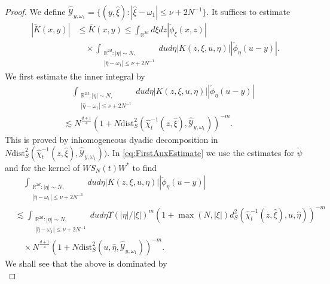\documentclass[10pt,a4paper]{amsart}
\newcommand{\R}{\mathbb{R}}
\begin{document}
\begin{proof}
We define $\hat{\mathcal{Y}}_{y,\omega_1} = \{ (y,\hat{\xi}) : |\hat{\xi} - \omega_1| \leq \nu + 2 N^{-1} \} $. It suffices to estimate
\begin{equation*}
\begin{split}
    |\tilde{K}(x,y)| &\leq \bar{K}(x,y) \leq \int_{\R^{2d}} d\xi dz |\check{\phi}_{\xi}(x,z)| \\
    &\quad \times \int_{\substack{\R^{2d}: |\eta| \sim N, \\ |\hat{\eta} - \omega_1| \leq \nu + 2 N^{-1}}} du d\eta |K(z,\xi,u,\eta)| |\check{\phi}_{\eta}(u-y)|.
\end{split}
\end{equation*}
We first estimate the inner integral by
\begin{equation}
\label{eq:FirstAuxEstimate}
\begin{split}
    &\quad \int_{\substack{\R^{2d}: |\eta| \sim N, \\ |\hat{\eta} - \omega_1| \leq \nu + 2 N^{-1}}} du d\eta |K(z,\xi,u,\eta)| |\check{\phi}_{\eta}(u-y)| \\
    &\lesssim N^{\frac{d+1}{4}} (1 + N \text{dist}_S^2(\hat{\chi}_t^{-1}(z,\hat{\xi}),\hat{\mathcal{Y}}_{y,\omega_1}))^{-m}.
\end{split}
\end{equation}
This is proved by inhomogeneous dyadic decomposition in $N \text{dist}_S^2(\hat{\chi}_t^{-1}(z,\hat{\xi}),\hat{\mathcal{Y}}_{y,\omega_1}))$. In \eqref{eq:FirstAuxEstimate} we use the estimates for $\check{\psi}$ and for the kernel of $W S_N(t) W^*$ to find
\begin{equation*}
\begin{split}
    &\quad \int_{\substack{\R^{2d}: |\eta| \sim N, \\ |\hat{\eta} - \omega_1| \leq \nu + 2 N^{-1}}} du d\eta |K(z,\xi,u,\eta)| |\check{\phi}_{\eta}(u-y)| \\
    &\lesssim \int_{\substack{\R^{2d}: |\eta| \sim N, \\ |\hat{\eta} - \omega_1| \leq \nu + 2 N^{-1}}} du d\eta \Upsilon(|\eta|/|\xi|)^m (1+ \max(N,|\xi|) d_S^2(\hat{\chi}_t^{-1}(z,\hat{\xi}),u,\hat{\eta}))^{-m} \\
    &\quad \times N^{\frac{d+1}{4}} (1+ N \text{dist}_S^2(u,\hat{\eta},\hat{\mathcal{Y}}_{y,\omega_1}))^{-m}.
\end{split}
\end{equation*}
We shall see that the above is dominated by
\begin{equation*}

\end{equation*}
\end{proof}
\end{document}
